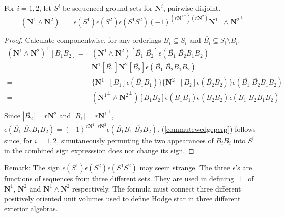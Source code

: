 \documentclass[Unicode]{cedram-alco}
\newcommand{\ext}[1]{\ensuremath{\mathbf{#1}}}
\begin{document}
\newcommand{\Nsup}[1]{\ext{N}^{#1}}
\newcommand{\NsupPerp}[1]{{\ext{N}^{#1}}^\perp}

\begin{prop}
  For $i=1, 2$, let $S^{i}$ be sequenced ground sets for $\ext{N}^{i}$, pairwise disjoint.
  \begin{equation}\label{commutewedgeperp}
    (\Nsup{1}\wedge\Nsup{2})^\perp =
    \epsilon(S^{1})\epsilon(S^{2})\epsilon(S^{1}S^{2})(-1)^{(r{\NsupPerp{1}})( r\Nsup{2})}
        \NsupPerp{1}\wedge\NsupPerp{2}
    \end{equation}
\end{prop}
\begin{proof}
  Calculate componentwise, for any orderings
  $B_i\subseteq S_i$ and $\overline{B_i}\subseteq S_i\setminus B_i$:
  \begin{equation*}
    \begin{split}
      (\Nsup{1}\wedge\Nsup{2})^\perp[B_1B_2]=
      &(\Nsup{1}\wedge\Nsup{2})[\overline{B_1}\;\overline{B_2}]
      \epsilon(\overline{B_1}\;\overline{B_2}B_1 B_2)\\
      =&\Nsup{1}[\overline{B_1}]\Nsup{2}[\overline{B_2}]\epsilon(\overline{B_1}\;\overline{B_2}B_1 B_2)\\
    =&\{\NsupPerp{1}[B_1]\epsilon(\overline{B_1}B_1)\}
    \{\NsupPerp{2}[B_2]\epsilon(\overline{B_2}B_2)\}\epsilon(\overline{B_1}\;\overline{B_2}B_1 B_2)\\
    =&(\NsupPerp{1}\wedge\NsupPerp{2})[B_1B_2]\epsilon(\overline{B_1}B_1)\epsilon(\overline{B_2}B_2)\epsilon(\overline{B_1}\;\overline{B_2}B_1 B_2)\\
    \end{split}
  \end{equation*}
  Since $|\overline{B_2}|=r\Nsup{2}$ and $|B_1|=r\NsupPerp{1}$,
$%
  \epsilon(\overline{B_1}\;\overline{B_2}B_1 B_2)=(-1)^{r\NsupPerp{1}r\Nsup{2}}\epsilon(\overline{B_1}B_1\;\overline{B_2} B_2)
$. %
  (\ref{commutewedgeperp}) follows since, for $i=1,2$, simutaneously permuting
  the two appearances of $\overline{B_i}B_i$ into $S^{i}$ in the combined sign expresssion does
  not change its sign.
\end{proof}

Remark: The sign $\epsilon(S^{1})\epsilon(S^{2})\epsilon(S^{1}S^{2})$ may seem strange.
The three $\epsilon$'s are functions of sequences from three different sets.  They are
used  in defining $\perp$ of $\Nsup{1}$, $\Nsup{2}$ and $\Nsup{1}\wedge\Nsup{2}$ respectively.
The formula must connect three different positively oriented unit volumes
used to define Hodge star in three different exterior algebras.
\end{document}
